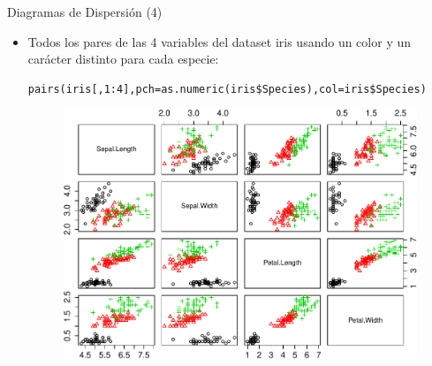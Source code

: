 \documentclass[handout]{beamer}
\begin{document}
\begin{frame}[fragile]{Diagramas de Dispersión (4)}
\scriptsize{
\begin{itemize}
 \item Todos los pares de las 4 variables del dataset iris usando un color y un carácter distinto para cada especie:
 \begin{verbatim}
pairs(iris[,1:4],pch=as.numeric(iris$Species),col=iris$Species)
 \end{verbatim}

  \begin{figure}[h!]
	\centering
	\includegraphics[scale=0.5]{imagenes/scatter2.pdf}		
\end{figure} 
 
 
\end{itemize}

}
 
\end{frame}
\end{document}
